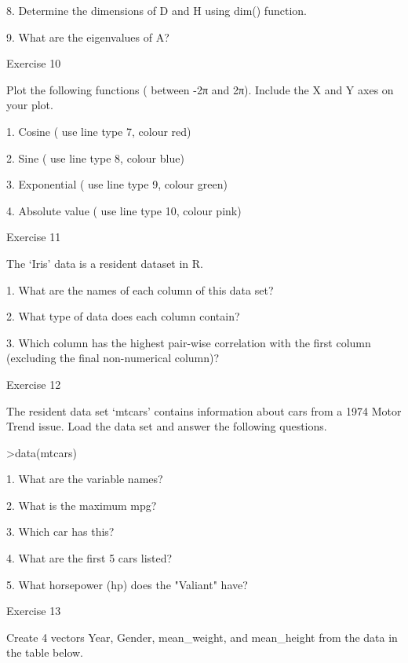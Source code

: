 8.
Determine the dimensions of D and H using dim() function.

9.
What are the eigenvalues of A?


  

Exercise 10

 

Plot the following functions ( between -2π and 2π). Include the X and Y axes on your plot.

 

1.    Cosine                              ( use line type 7, colour  red)

2.    Sine                                  ( use line type 8, colour blue)

3.    Exponential                      ( use line type 9, colour green)

4.     Absolute value                 ( use line type 10, colour pink)

 

Exercise 11

 

The ‘Iris’ data is a resident dataset in R.

 
1.
What are the names of each column of this data set?

2.
What type of data does each column contain?

3.
Which column has the highest pair-wise correlation with the first column (excluding the final non-numerical column)?


 

Exercise 12

 

The resident data set ‘mtcars’ contains information about cars from a 1974 Motor Trend issue. Load the data set and answer the following questions.

>data(mtcars)

 

1. What are the variable names?

2. What is the maximum mpg?

3. Which car has this?

4. What are the first 5 cars listed?

5. What horsepower (hp) does the "Valiant" have?

 

 

Exercise 13

 

Create 4 vectors Year, Gender, mean_weight, and mean_height from the data in the table below.

